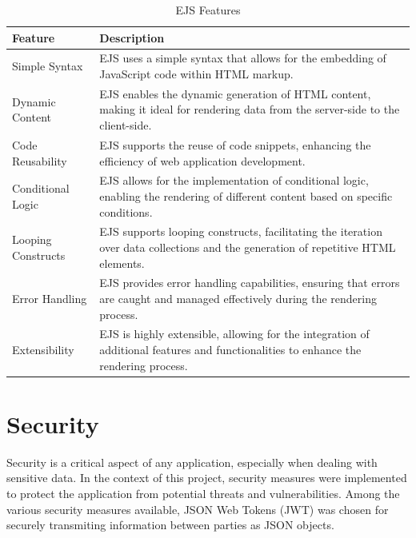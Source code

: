 \begin{table}[H]
    \centering
    \begin{tabularx}{\textwidth}{|l|X|}
        \hline
        \textbf{Feature}     & \textbf{Description}                                                                                                                              \\
        \hline
        Simple Syntax       & EJS uses a simple syntax that allows for the embedding of JavaScript code within HTML markup.                                                      \\
        \hline
        Dynamic Content     & EJS enables the dynamic generation of HTML content, making it ideal for rendering data from the server-side to the client-side.                      \\
        \hline
        Code Reusability    & EJS supports the reuse of code snippets, enhancing the efficiency of web application development.                                                    \\
        \hline
        Conditional Logic   & EJS allows for the implementation of conditional logic, enabling the rendering of different content based on specific conditions.                      \\
        \hline
        Looping Constructs  & EJS supports looping constructs, facilitating the iteration over data collections and the generation of repetitive HTML elements.                      \\
        \hline
        Error Handling      & EJS provides error handling capabilities, ensuring that errors are caught and managed effectively during the rendering process.                         \\
        \hline
        Extensibility       & EJS is highly extensible, allowing for the integration of additional features and functionalities to enhance the rendering process.                      \\
        \hline
    \end{tabularx}
    \label{tab:ejs}
    \caption{EJS Features}
\end{table}

\section{Security}
Security is a critical aspect of any application, especially when dealing with sensitive data. In the context of this project, security measures were implemented 
to protect the application from potential threats and vulnerabilities. Among the various security measures available, JSON Web Tokens (JWT) was chosen for securely
transmiting information between parties as JSON objects. 

